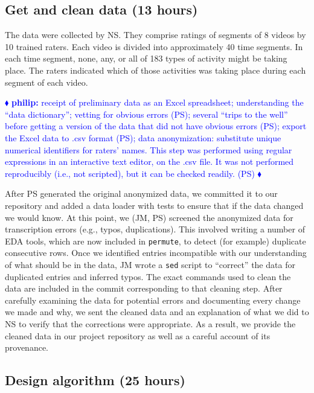 \documentclass[]{article}
\newcommand{\philip}[1] { \textcolor{blue} {
\ensuremath{\blacklozenge} {\bf philip:}  {#1}
\ensuremath{\blacklozenge} } }
\begin{document}
\subsection{Get and clean data (13 hours)}

The data were collected by NS.
They comprise ratings of segments of 8 videos by 10 trained raters.
Each video is divided into approximately 40 time segments.
In each time segment, none, any, or all of 183 types of activity might be
taking place.
The raters indicated which of those activities was taking place during each
segment of each video.

\philip{
receipt of preliminary data as an Excel spreadsheet; understanding the ``data
dictionary''; vetting for obvious errors (PS);
several ``trips to the well'' before getting a version of the data that did not
have obvious errors (PS);
export the Excel data to .csv format (PS);
data anonymization: substitute unique numerical identifiers for raters' names. 
This step was performed using regular expressions in an interactive text
editor, on the .csv file.
It was not performed reproducibly (i.e., not scripted), but it can be checked
readily. (PS) 
}

After PS generated the original anonymized data, we committed it to our
repository and added a data loader with tests to ensure that if the data
changed we would know.
At this point, we (JM, PS) screened the anonymized data for transcription
errors (e.g., typos, duplications).
This involved writing a number of EDA tools, which are now included in
\texttt{permute}, to detect (for example) duplicate consecutive rows.
Once we identified entries incompatible with our understanding of what should
be in the data, JM wrote a \texttt{sed} script to ``correct'' the data for
duplicated entries and inferred typos.
The exact commands used to clean the data are included in the commit
corresponding to that cleaning step.
After carefully examining the data for potential errors and documenting
every change we made and why, we sent the cleaned data and an explanation
of what we did to NS to verify that the corrections were appropriate.
As a result, we provide the cleaned data in our project repository as well
as a careful account of its provenance.

\subsection{Design algorithm (25 hours)}
\end{document}
